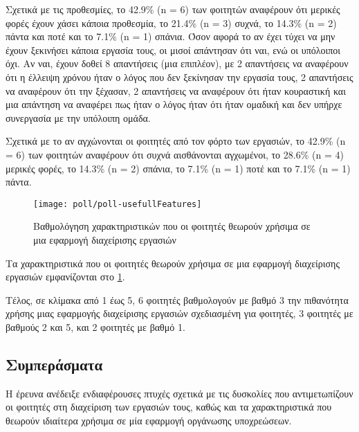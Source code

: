             Σχετικά με τις προθεσμίες, το 42.9\% (n = 6) των φοιτητών αναφέρουν ότι μερικές φορές έχουν χάσει κάποια προθεσμία, το 21.4\% (n = 3) συχνά, το 14.3\% (n = 2) πάντα και ποτέ και το 7.1\% (n = 1) σπάνια. Όσον αφορά το αν έχει τύχει να μην έχουν ξεκινήσει κάποια εργασία τους, οι μισοί απάντησαν ότι ναι, ενώ οι υπόλοιποι όχι. Αν ναι, έχουν δοθεί 8 απαντήσεις (μια επιπλέον), με 2 απαντήσεις να αναφέρουν ότι η έλλειψη χρόνου ήταν ο λόγος που δεν ξεκίνησαν την εργασία τους, 2 απαντήσεις να αναφέρουν ότι την ξέχασαν, 2 απαντήσεις να αναφέρουν ότι ήταν κουραστική και μια απάντηση να αναφέρει πως ήταν ο λόγος ήταν ότι ήταν ομαδική και δεν υπήρχε συνεργασία με την υπόλοιπη ομάδα.

            Σχετικά με το αν αγχώνονται οι φοιτητές από τον φόρτο των εργασιών, το 42.9\% (n = 6) των φοιτητών αναφέρουν ότι συχνά αισθάνονται αγχωμένοι, το 28.6\% (n = 4) μερικές φορές, το 14.3\% (n = 2) σπάνια, το 7.1\% (n = 1) ποτέ και το 7.1\% (n = 1) πάντα.

            \begin{figure}[h!] \noindent \centering
                \texttt{[image: poll/poll-usefullFeatures]}
                \caption{Βαθμολόγηση χαρακτηριστικών που οι φοιτητές θεωρούν χρήσιμα σε μια εφαρμογή διαχείρισης εργασιών}
                \label{fig:poll-usefullFeatures}
            \end{figure}

            Τα χαρακτηριστικά που οι φοιτητές θεωρούν χρήσιμα σε μια εφαρμογή διαχείρισης εργασιών εμφανίζονται στο \ref{fig:poll-usefullFeatures}.

            Τέλος, σε κλίμακα από 1 έως 5, 6 φοιτητές βαθμολογούν με βαθμό 3 την πιθανότητα χρήσης μιας εφαρμογής διαχείρισης εργασιών σχεδιασμένη για φοιτητές, 3 φοιτητές με βαθμούς 2 και 5, και 2 φοιτητές με βαθμό 1.

        \subsection{Συμπεράσματα}
            Η έρευνα ανέδειξε ενδιαφέρουσες πτυχές σχετικά με τις δυσκολίες που αντιμετωπίζουν οι φοιτητές στη διαχείριση των εργασιών τους, καθώς και τα χαρακτηριστικά που θεωρούν ιδιαίτερα χρήσιμα σε μία εφαρμογή οργάνωσης υποχρεώσεων.

